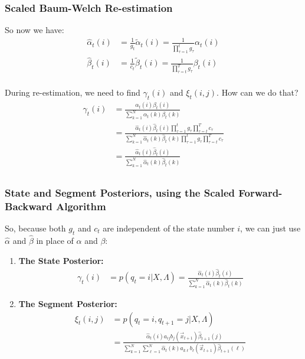 \documentclass{beamer}
\begin{document}
\begin{frame}
  \frametitle{Scaled Baum-Welch Re-estimation}

  So now we have:
  \begin{align*}
    \hat\alpha_t(i)  &= \frac{1}{g_t}\tilde\alpha_t(i) = \frac{1}{\prod_{\tau=1}^tg_\tau}\alpha_t(i)\\
    \hat\beta_t(i)  &= \frac{1}{c_t}\tilde\beta_t(i) = \frac{1}{\prod_{\tau=t}^Tg_\tau}\beta_t(i)\\
  \end{align*}

  During re-estimation, we need to find $\gamma_t(i)$ and $\xi_t(i,j)$.  How can we do that?
  \begin{align*}
    \gamma_t(i) & = \frac{\alpha_t(i)\beta_t(i)}{\sum_{k=1}^N\alpha_t(k)\beta_t(k)}\\
    & = \frac{\hat\alpha_t(i)\hat\beta_t(i)\prod_{\tau=1}^tg_\tau\prod_{\tau=t}^Tc_\tau}
          {\sum_{k=1}^N\hat\alpha_t(k)\hat\beta_t(k)\prod_{\tau=1}^tg_\tau\prod_{\tau=t}^Tc_\tau}\\
          & = \frac{\hat\alpha_t(i)\hat\beta_t(i)}{\sum_{k=1}^N\hat\alpha_t(k)\hat\beta_t(k)}\\          
  \end{align*}
\end{frame}

\begin{frame}
  \frametitle{State and Segment Posteriors, using the Scaled Forward-Backward Algorithm}

  So, because both $g_t$ and $c_t$ are independent of the state number
  $i$, we can just use $\hat\alpha$ and $\hat\beta$ in place of
  $\alpha$ and $\beta$:
  \begin{enumerate}
  \item {\bf The State Posterior:}
    \begin{align*}
      \gamma_t(i) & = p(q_t=i|X,\Lambda)
      = \frac{\hat\alpha_t(i)\hat\beta_t(i)}{\sum_{k=1}^N\hat\alpha_t(k)\hat\beta_t(k)}
    \end{align*}
  \item {\bf The Segment Posterior:}
    \begin{align*}
      \xi_t(i,j) & = p(q_t=i,q_{t+1}=j|X,\Lambda)\\
      &= \frac{\hat\alpha_t(i)a_{ij}b_j(\vec{x}_{t+1})\hat\beta_{t+1}(j)}{\sum_{k=1}^N\sum_{\ell=1}^N\hat\alpha_t(k)a_{k\ell}b_\ell(\vec{x}_{t+1})\hat\beta_{t+1}(\ell)}
    \end{align*}
  \end{enumerate}
\end{frame}
\end{document}
